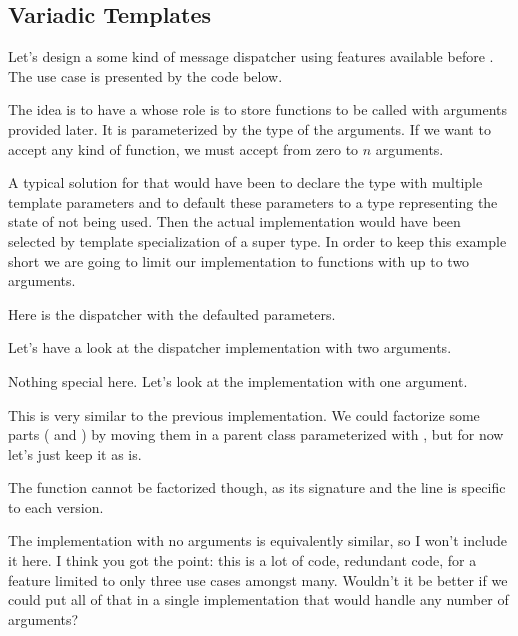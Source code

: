 \subsection{Variadic Templates}
\label{variadic-template}

Let's design a some kind of message dispatcher using features
available before . The use case is presented by the code below.



The idea is to have a  whose role is to store
functions to be called with arguments provided later. It is
parameterized by the type of the arguments. If we want to accept any
kind of function, we must accept from zero to $n$ arguments.

A typical solution for that would have been to declare the type with
multiple template parameters and to default these parameters to a type
representing the state of not being used. Then the actual
implementation would have been selected by template specialization of
a super type. In order to keep this example short we are going to
limit our implementation to functions with up to two arguments.

Here is the dispatcher with the defaulted parameters.



Let's have a look at the dispatcher implementation with two arguments.



Nothing special here. Let's look at the implementation with one
argument.



This is very similar to the previous implementation. We could
factorize some parts ( and ) by
moving them in a parent class parameterized with
, but for now let's just keep it as is.

The  function cannot be factorized though, as its
signature and the  line is specific to
each version.

The implementation with no arguments is equivalently similar, so I
won't include it here. I think you got the point: this is a lot of
code, redundant code, for a feature limited to only three use cases
amongst many. Wouldn't it be better if we could put all of that in a
single implementation that would handle any number of arguments?

